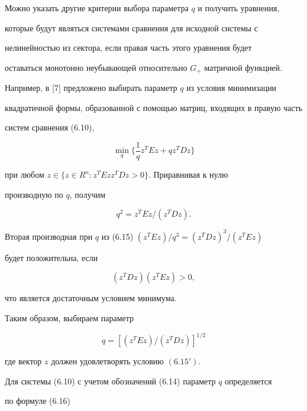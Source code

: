 Можно указать другие критерии выбора параметра $q$ и получить уравнения,


которые будут являться системами сравнения для исходной системы с


нелинейностью из сектора, если правая часть этого уравнения будет


оставаться монотонно неубывающей относительно $G_+$ матричной функцией.


Например, в [7] предложено выбирать параметр $q$ из условия минимизации


квадратичной формы, образованной с помощью матриц, входящих в правую часть


систем сравнения (6.10),


$$


\min_q\bigg\{\frac{1}{q}z^T E z+q z^T D z\bigg\}


$$


при любом $z\in\{z\in R^n:z^T E z z^T D z>0\}$. Приравнивая к нулю


производную по $q$, получим


\begin{equation}


q^2=z^T E z/(z^T D z).


\end{equation}


Вторая производная при $q$ из (6.15) $(z^T E z)/q^3=(z^T D z)^3/(z^T E z)$


будет положительна, если


\begin{equation}


(z^T D z)(z^T E z)>0, \tag{6.15$'$}


\end{equation}


что является достаточным условием минимума.


Таким образом, выбираем параметр


\begin{equation}


q=[(z^T E z)/(z^T D z)]^{1/2}


\end{equation}


где вектор $z$ должен удовлетворять условию $(6.15')$.





Для системы (6.10) с учетом обозначений (6.14) параметр $q$ определяется


по формуле (6.16)


